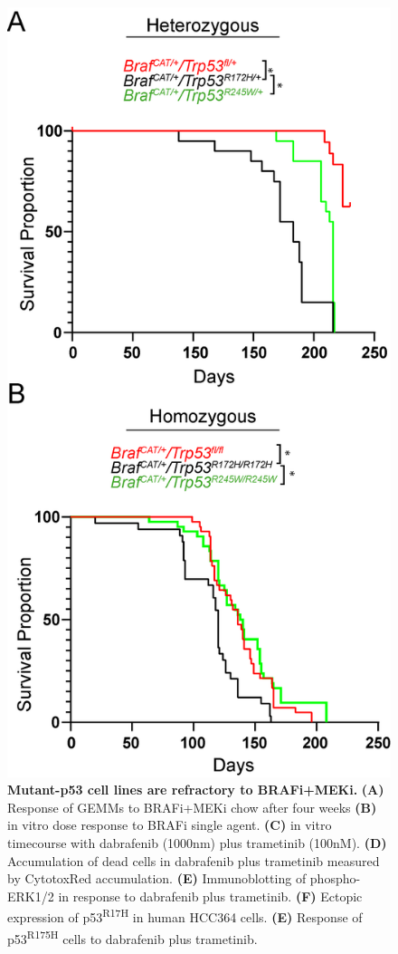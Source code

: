 \begin{figure}
\hypertarget{fig:13}{%
\centering
\includegraphics[width=1\textwidth,height=\textheight]{images/p53_3.png}
\caption{\textbf{Mutant-p53 cell lines are refractory to BRAFi+MEKi.} \textbf{(A)} Response of GEMMs to BRAFi+MEKi chow after four weeks \textbf{(B)} in vitro dose response to BRAFi single agent. \textbf{(C)} in vitro timecourse with dabrafenib (1000nm) plus trametinib (100nM). \textbf{(D)} Accumulation of dead cells in dabrafenib plus trametinib measured by CytotoxRed accumulation. \textbf{(E)} Immunoblotting of phospho-ERK1/2 in response to dabrafenib plus trametinib. \textbf{(F)} Ectopic expression of p53\textsuperscript{R17H} in human HCC364 cells. \textbf{(E)} Response of p53\textsuperscript{R175H} cells to dabrafenib plus trametinib.}\label{fig:13}
}
\end{figure}

